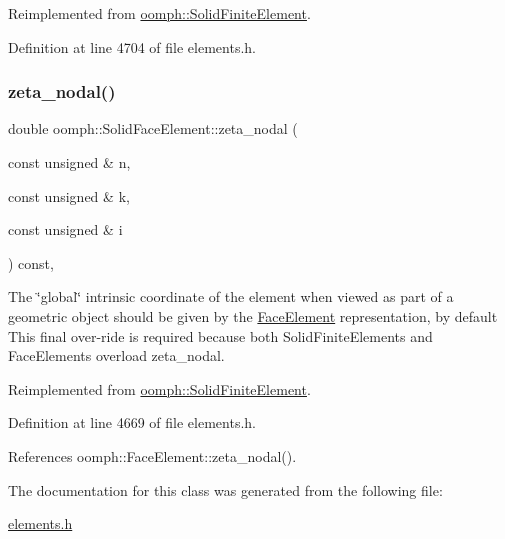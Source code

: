 Reimplemented from \hyperlink{classoomph_1_1SolidFiniteElement_ae7a83078da76450db70b82b97f70bc2d}{oomph\+::\+Solid\+Finite\+Element}.



Definition at line 4704 of file elements.\+h.

\mbox{\label{classoomph_1_1SolidFaceElement_a28526b0f7a7daa2ab90348e16cf6a529}} 
\subsubsection{\texorpdfstring{zeta\+\_\+nodal()}{zeta\_nodal()}}
{\footnotesize\ttfamily double oomph\+::\+Solid\+Face\+Element\+::zeta\+\_\+nodal (\begin{DoxyParamCaption}\item[{const unsigned \&}]{n,  }\item[{const unsigned \&}]{k,  }\item[{const unsigned \&}]{i }\end{DoxyParamCaption}) const\hspace{0.3cm}{\ttfamily [inline]}, {\ttfamily [virtual]}}



The \char`\"{}global\char`\"{} intrinsic coordinate of the element when viewed as part of a geometric object should be given by the \hyperlink{classoomph_1_1FaceElement}{Face\+Element} representation, by default This final over-\/ride is required because both Solid\+Finite\+Elements and Face\+Elements overload zeta\+\_\+nodal. 



Reimplemented from \hyperlink{classoomph_1_1SolidFiniteElement_a4a377d7acaa7fbe444a65ed3d4a79bed}{oomph\+::\+Solid\+Finite\+Element}.



Definition at line 4669 of file elements.\+h.



References oomph\+::\+Face\+Element\+::zeta\+\_\+nodal().



The documentation for this class was generated from the following file\+:\begin{DoxyCompactItemize}
\item 
\hyperlink{elements_8h}{elements.\+h}\end{DoxyCompactItemize}
